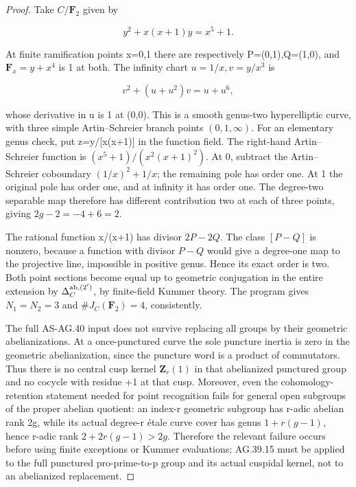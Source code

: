 \begin{proof}

Take \(C/\mathbf{F}_2\) given by

\[y^2+x(x+1)y=x^5+1.\]

At finite ramification points x=0,1 there are respectively P=(0,1),Q=(1,0), and \(\mathbf{F}_x=y+x^4\) is 1 at both. The infinity chart \(u=1/x,v=y/x^3\) is

\[v^2+(u+u^2)v=u+u^6,\]

whose derivative in u is 1 at (0,0). This is a smooth genus-two hyperelliptic curve, with three simple Artin--Schreier branch points \((0,1,{\infty})\). For an elementary genus check, put z=y/{[}x(x+1){]} in the function field. The right-hand Artin--Schreier function is \((x^5+1)/(x^2(x+1)^2)\). At 0, subtract the Artin--Schreier coboundary \((1/x)^2+1/x\); the remaining pole has order one. At 1 the original pole has order one, and at infinity it has order one. The degree-two separable map therefore has different contribution two at each of three points, giving \(2g-2=-4+6=2\).

The rational function x/(x+1) has divisor \(2P-2Q\). The class \([P-Q]\) is nonzero, because a function with divisor \(P-Q\) would give a degree-one map to the projective line, impossible in positive genus. Hence its exact order is two. Both point sections become equal up to geometric conjugation in the entire extension by \(\Delta_C^{\rm ab,(2')}\), by finite-field Kummer theory. The program gives \(N_1=N_2=3\) and \(\#J_C(\mathbf{F}_2)=4\), consistently.

The full AS-AG.40 input does not survive replacing all groups by their geometric abelianizations. At a once-punctured curve the sole puncture inertia is zero in the geometric abelianization, since the puncture word is a product of commutators. Thus there is no central cusp kernel \(\mathbf{Z}_r(1)\) in that abelianized punctured group and no cocycle with residue +1 at that cusp. Moreover, even the cohomology-retention statement needed for point recognition fails for general open subgroups of the proper abelian quotient: an index-r geometric subgroup has r-adic abelian rank 2g, while its actual degree-r étale curve cover has genus \(1+r(g-1)\), hence r-adic rank \(2+2r(g-1)>2g\). Therefore the relevant failure occurs before using finite exceptions or Kummer evaluations; AG.39.15 must be applied to the full punctured pro-prime-to-p group and its actual cuspidal kernel, not to an abelianized replacement.


\end{proof}

